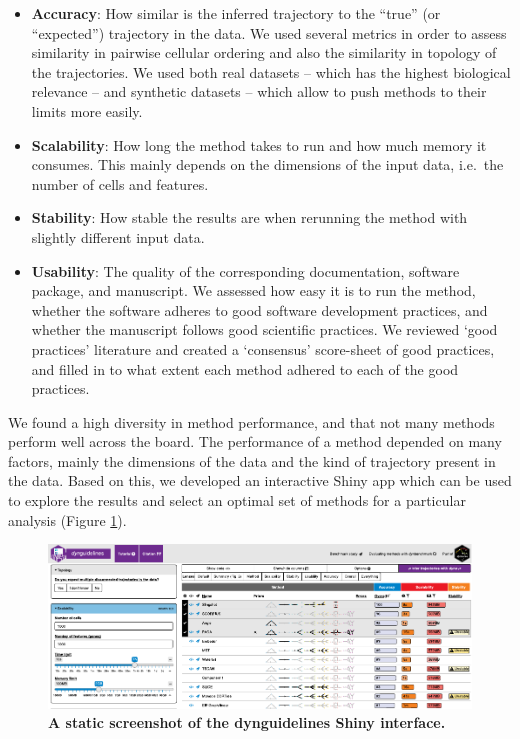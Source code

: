\begin{itemize}
	\tightlist
	\item \textbf{Accuracy}: How similar is the inferred trajectory to the
	``true'' (or ``expected'') trajectory in the data. We used several
	metrics in order to assess similarity in pairwise cellular ordering
	and also the similarity in topology of the trajectories. We used both
	real datasets -- which has the highest biological relevance -- and
	synthetic datasets -- which allow to push methods to their limits more
	easily.
	\item \textbf{Scalability}: How long the method takes to run and how much
	memory it consumes. This mainly depends on the dimensions of the input
	data, i.e.~the number of cells and features.
	\item \textbf{Stability}: How stable the results are when rerunning the
	method with slightly different input data.
	\item \textbf{Usability}: The quality of the corresponding documentation,
	software package, and manuscript. We assessed how easy it is to run
	the method, whether the software adheres to good software development
	practices, and whether the manuscript follows good scientific
	practices. We reviewed `good practices' literature and created a
	`consensus' score-sheet of good practices, and filled in to what extent
	each method adhered to each of the good practices.
\end{itemize}

We found a high diversity in method performance, and that not many
methods perform well across the board. The performance of a method
depended on many factors, mainly the dimensions of the data and the kind
of trajectory present in the data. Based on this, we developed an
interactive Shiny \cite{rstudio_webapplicationframework_2016} app which can be used to explore the results and
select an optimal set of methods for a particular analysis
(Figure \ref{fig:dynguidelines_interface}).

\begin{figure}[htb!]
	\centering
	\includegraphics[width=\linewidth]{fig/shiny.pdf}
	\caption{\textbf{A static screenshot of the {dynguidelines} Shiny interface.}}
	\label{fig:dynguidelines_interface}
\end{figure}


